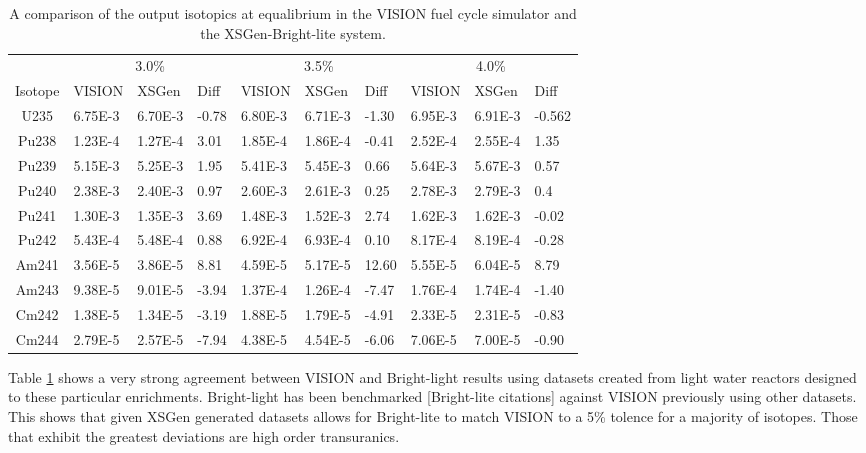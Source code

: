 \documentclass{article}
\newcommand\mTW{1.25cm}
\begin{document}
\begin{table}[!htb]
\centering
\small
\caption{A comparison of the output isotopics at equalibrium in the VISION fuel cycle simulator and the XSGen-Bright-lite system.}
\label{tab:a}
\vspace{0.5em}
\hspace*{-5em}\begin{tabular}{|c| m{\mTW} m{\mTW} m{1cm}| m{\mTW} m{\mTW} m{1cm} | m{\mTW} m{\mTW} m{1cm} |}
 & \multicolumn{3}{c}{3.0\%} & \multicolumn{3}{c}{3.5\%} & \multicolumn{3}{c}{4.0\%} \\
Isotope & VISION & XSGen & Diff & VISION & XSGen & Diff & VISION & XSGen & Diff \\
\hline
U235 & 6.75E-3 & 6.70E-3 & -0.78 & 6.80E-3 & 6.71E-3 & -1.30 & 6.95E-3 & 6.91E-3 & -0.562 \\
Pu238 & 1.23E-4 & 1.27E-4 & 3.01 & 1.85E-4 & 1.86E-4 & -0.41 & 2.52E-4 & 2.55E-4 & 1.35 \\
Pu239 & 5.15E-3 & 5.25E-3 & 1.95 & 5.41E-3 & 5.45E-3 & 0.66 & 5.64E-3 & 5.67E-3 & 0.57 \\
Pu240 & 2.38E-3 & 2.40E-3 & 0.97 & 2.60E-3 & 2.61E-3 & 0.25 & 2.78E-3 & 2.79E-3 & 0.4 \\
Pu241 & 1.30E-3 & 1.35E-3 & 3.69 & 1.48E-3 & 1.52E-3 & 2.74 & 1.62E-3 & 1.62E-3 & -0.02 \\
Pu242 & 5.43E-4 & 5.48E-4 & 0.88 & 6.92E-4 & 6.93E-4 & 0.10 & 8.17E-4 & 8.19E-4 & -0.28 \\
Am241 & 3.56E-5 & 3.86E-5 & 8.81 & 4.59E-5 & 5.17E-5 & 12.60 & 5.55E-5 & 6.04E-5 & 8.79 \\
Am243 & 9.38E-5 & 9.01E-5 & -3.94 & 1.37E-4 & 1.26E-4 & -7.47 & 1.76E-4 & 1.74E-4 & -1.40 \\
Cm242 & 1.38E-5 & 1.34E-5 & -3.19 & 1.88E-5 & 1.79E-5 & -4.91 & 2.33E-5 & 2.31E-5 & -0.83 \\
Cm244 & 2.79E-5 & 2.57E-5 & -7.94 & 4.38E-5 & 4.54E-5 & -6.06 & 7.06E-5 & 7.00E-5 & -0.90 \\
\hline
\end{tabular}
\end{table}

Table \ref{tab:a} shows a very strong agreement between VISION and Bright-light results using datasets created from light water reactors designed to these particular enrichments. Bright-light has been benchmarked [Bright-lite citations] against VISION previously using other datasets. This shows that given XSGen generated datasets allows for Bright-lite to match VISION to a 5\% tolence for a majority of isotopes. Those that exhibit the greatest deviations are high order transuranics. 
\end{document}
